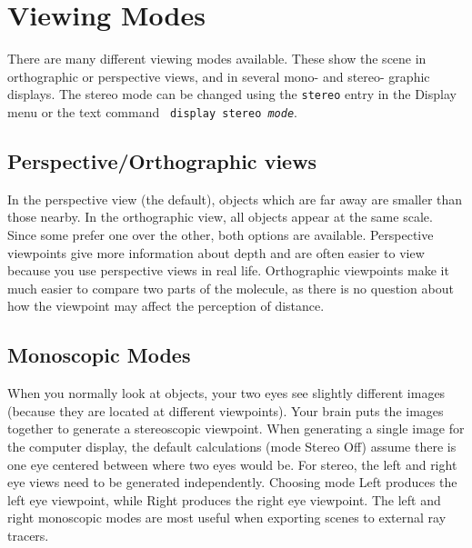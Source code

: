 %
%
%

\chapter{Viewing Modes}
\label{ug:topic:stereo}

There are many different viewing modes available.  These show the
scene in orthographic or perspective views, and in several mono- and
stereo- graphic displays.
The stereo mode can be changed using the
{\tt stereo} entry in the Display menu or the text command {\tt
display stereo {\em mode}}.

\section{Perspective/Orthographic views}
In the perspective view (the default), objects which are far away are
smaller than those nearby.  In the orthographic view, all objects
appear at the same scale.  Since some prefer one over the other, both
options are available.  Perspective viewpoints give more information
about depth and are often easier to view because you use perspective
views in real life.  Orthographic viewpoints make it much easier to
compare two parts of the molecule, as there is no question about how
the viewpoint may affect the perception of distance.

\section{Monoscopic Modes}
When you normally look at objects, your two eyes see slightly
different images (because they are located at different viewpoints).
Your brain puts the images together to generate a stereoscopic
viewpoint.  When generating a single image for the computer display,
the default calculations (mode {\sf Stereo Off}) assume there is 
one eye centered between where two eyes would be.  
For stereo, the left and right eye views need to be generated independently.  
Choosing mode Left produces
the left eye viewpoint, while Right produces the right eye viewpoint.
The left and right monoscopic modes are most useful when exporting scenes
to external ray tracers.


